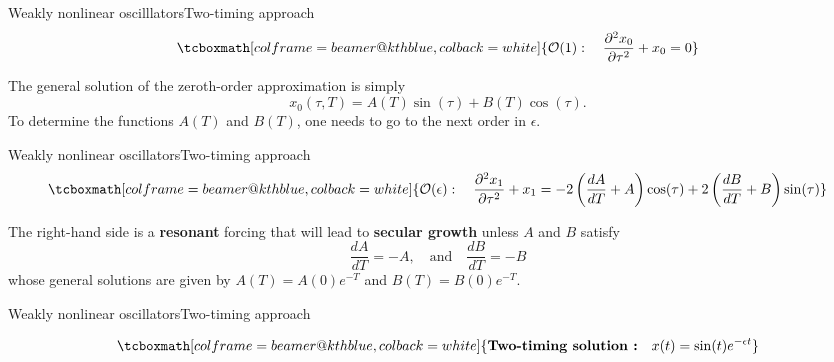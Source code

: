 \documentclass[usenames,dvipsnames,svgnames,10pt,aspectratio=169]{beamer}
\begin{document}
\begin{frame}[t, c]{Weakly nonlinear oscilllators}{Two-timing approach}
  \[
  \tcboxmath[colframe=beamer@kthblue, colback=white]{
    \mathcal{O}(1) : \quad \dfrac{\partial^2 x_0}{\partial \tau^2} + x_0 = 0
  }
  \]

  \bigskip

  The general solution of the zeroth-order approximation is simply
  \[
  x_0(\tau, T) = A(T) \sin(\tau) + B(T) \cos(\tau).
  \]
  To determine the functions $A(T)$ and $B(T)$, one needs to go to the next order in $\epsilon$.

\end{frame}




\begin{frame}[t, c]{Weakly nonlinear oscillators}{Two-timing approach}
  \[
  \tcboxmath[colframe=beamer@kthblue, colback=white]{
    \mathcal{O}(\epsilon) : \quad \dfrac{\partial^2 x_1}{\partial \tau^2} + x_1 = -2 \left( \dfrac{dA}{dT} + A \right) \cos(\tau) + 2 \left( \dfrac{dB}{dT} + B \right) \sin(\tau)
  }
  \]

  \bigskip

  The right-hand side is a \alert{\textbf{resonant}} forcing that will lead to \alert{\textbf{secular growth}} unless $A$ and $B$ satisfy
  \[
  \dfrac{dA}{dT} = - A, \quad \text{and} \quad \dfrac{dB}{dT} = -B
  \]
  whose general solutions are given by $A(T) = A(0) e^{-T}$ and $B(T) = B(0) e^{-T}$.
\end{frame}




\begin{frame}[t, c]{Weakly nonlinear oscillators}{Two-timing approach}
  \centering

  \[
  \tcboxmath[colframe=beamer@kthblue, colback=white]{
    \textbf{Two-timing solution :} \quad x(t) = \sin(t) e^{-\epsilon t}
  }
  \]

  \bigskip


  \vspace{1cm}
\end{frame}
\end{document}
